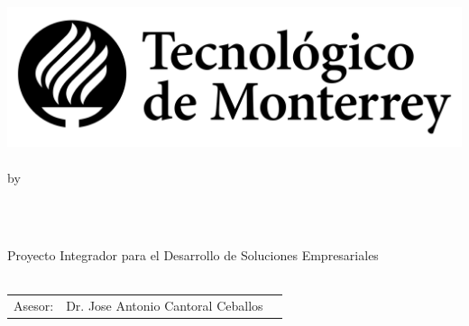 \documentclass[11pt, a4paper, oneside]{Thesis} %
\title{\ttitle}
\begin{document}
\frontmatter
{}

\fancyhead{}
\rhead{\thepage}
\lhead{}

\pagestyle{fancy}
\newcommand{\HRule}{\rule{\linewidth}{0.5mm}}

\hypersetup{pdfsubject=\subjectname}
\hypersetup{pdfkeywords=\keywordnames}


\begin{titlepage}
\begin{center}

\textsc{\Large \univname}\\
\textsc{\Large \facname}\\
\textsc{\Large \schoolname}\\[1cm]
\includegraphics[scale=.3]{img/logo.png} \\
\\[0.5cm]

\large by\\[0.5cm]

\begin{minipage}{0.4\textwidth}
\begin{center} \large
{}
\large{\href{mailto:albertcastaned@gmail.com?subject=Gaze-Tracking Thesis}{\authornames}} 
\\[0.5cm] 
\end{center}
\end{minipage}\\[0.5cm]

\large Proyecto Integrador para el Desarrollo de Soluciones Empresariales \\ \textit{\degreename}\\[0.8cm]

\begin{table}[!h]
\begin{center}
\begin{tabular}{lll}
\multicolumn{1}{r}{Asesor:} & Dr. Jose Antonio Cantoral Ceballos \\
\end{tabular}
\end{center}
\end{table}


\end{center}
\end{titlepage}
\end{document}
